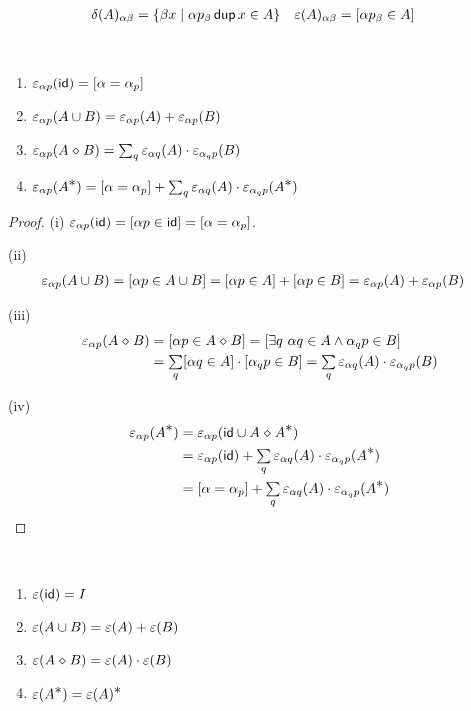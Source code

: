 \documentclass{article}
\renewcommand\smash{\mathrel{\diamond}}
\newcommand\ssum{\mathop{\textstyle\sum}}
\newcommand\pdup{\mathop{\mathsf{dup}}}
\newcommand\bval[1]{[#1]}
\renewcommand\star{^{\textstyle *}}
\newcommand\id{\mathsf{id}}
\begin{document}
\begin{align*}
\delta(A)_{\alpha\beta} &= \set{\beta x}{\alpha p_\beta\pdup x\in A}
&
\eps(A)_{\alpha\beta} &= \bval{\alpha p_\beta\in A}
\end{align*}

\begin{lemma}\ 
\begin{enumerate}
\romanize
\item
$\eps_{\alpha p}(\id) = \bval{\alpha=\alpha_p}$
\item
$\varepsilon_{\alpha p}(A\cup B) = \varepsilon_{\alpha p}(A) + \varepsilon_{\alpha p}(B)$
\item
$\eps_{\alpha p}(A\smash B) = \ssum_q\eps_{\alpha q}(A)\cdot\eps_{\alpha_q p}(B)$
\item
$\eps_{\alpha p}(A\star) = \bval{\alpha = \alpha_p} + \ssum_q\eps_{\alpha q}(A)\cdot\eps_{\alpha_q p}(A\star)$
\end{enumerate}
\end{lemma}

\begin{proof}
(i) $\eps_{\alpha p}(\id) = \bval{\alpha p\in\id} = \bval{\alpha=\alpha_p}$.

(ii)
\begin{align*}
\eps_{\alpha p}(A\cup B)
&= \bval{\alpha p\in A\cup B}
= \bval{\alpha p\in A}
+ \bval{\alpha p\in B}
= \eps_{\alpha p}(A)
+ \eps_{\alpha p}(B)
\end{align*}

(iii)
\begin{align*}
\eps_{\alpha p}(A\smash B)
&= \bval{\alpha p\in A\smash B}
= \bval{\exists q\ \alpha q\in A\meet \alpha_q p\in B}\\
&= \ssum_q \bval{\alpha q\in A}
\cdot
\bval{\alpha_q p\in B}
= \ssum_q\eps_{\alpha q}(A)\cdot\eps_{\alpha_q p}(B)
\end{align*}

(iv)
\begin{align*}
\eps_{\alpha p}(A\star)
&= \eps_{\alpha p}(\id\cup A\smash A\star)\\
&= \eps_{\alpha p}(\id) + \ssum_q\eps_{\alpha q}(A)\cdot\eps_{\alpha_q p}(A\star)\\
&= \bval{\alpha = \alpha_p}
+ \ssum_q\eps_{\alpha q}(A)\cdot\eps_{\alpha_q p}(A\star)
\end{align*}
\end{proof}

\begin{lemma}\ 
\begin{enumerate}
\romanize
\item
$\eps(\id) = I$
\item
$\varepsilon(A\cup B) = \varepsilon(A) + \varepsilon(B)$
\item
$\eps(A\smash B) = \eps(A)\cdot\eps(B)$
\item
$\eps(A\star) = \eps(A)\star$
\end{enumerate}
\end{lemma}
\end{document}
